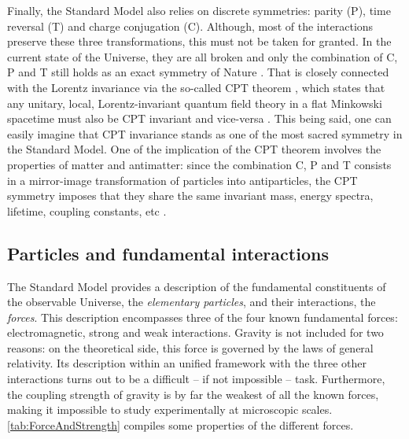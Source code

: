 Finally, the Standard Model also relies on discrete symmetries: parity (P), time reversal (T) and charge conjugation (C). Although, most of the interactions preserve these three transformations, this must not be taken for granted. In the current state of the Universe, they are all broken and only the combination of C, P and T still holds as an exact symmetry of Nature \cite{sozziTestsDiscreteSymmetries2019}. That is closely connected with the Lorentz invariance via the so-called CPT theorem \cite{lehnertCPTSymmetryIts2016}, which states that any unitary, local, Lorentz-invariant quantum field theory in a flat Minkowski spacetime must also be CPT invariant and vice-versa \cite{lehnertCPTSymmetryIts2016}\cite{sachsPhysicsTimeReversal1987}. This being said, one can easily imagine that CPT invariance stands as one of the most sacred symmetry in the Standard Model. One of the implication of the CPT theorem involves the properties of matter and antimatter: since the combination C, P and T consists in a mirror-image transformation of particles into antiparticles, the CPT symmetry imposes that they share the same invariant mass, energy spectra, lifetime, coupling constants, etc  \cite{lehnertCPTSymmetryIts2016}\cite{schotterMultidifferentialInvestigationStrangeness2023}.

\subsection{Particles and fundamental interactions}
\label{subsec:ParticleAndInteractions}

The Standard Model provides a description of the fundamental constituents of the observable Universe, the \textit{elementary particles}, and their interactions, the  \textit{forces}. This description encompasses three of the four known fundamental forces: electromagnetic, strong and weak interactions. Gravity is not included for two reasons: on the theoretical side, this force is governed by the laws of general relativity. Its description within an unified framework with the three other interactions turns out to be a difficult -- if not impossible -- task. Furthermore, the coupling strength of gravity is by far the weakest of all the known forces, making it impossible to study experimentally at microscopic scales. \Tab\ref{tab:ForceAndStrength} compiles some properties of the different forces.

